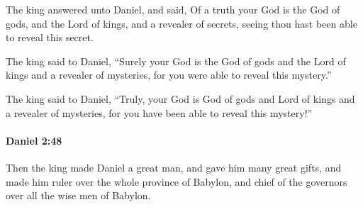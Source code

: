 			\begin{versebox}
					\item[BHS] 
					\item[LXX] 
					\item[ASV] The king answered unto Daniel, and said, Of a truth your God is the God of gods, and the Lord of kings, and a revealer of secrets, seeing thou hast been able to reveal this secret.
					\item[NIV] The king said to Daniel, “Surely your God is the God of gods and the Lord of kings and a revealer of mysteries, for you were able to reveal this mystery.”
					\item[NRSV] The king said to Daniel, “Truly, your God is God of gods and Lord of kings and a revealer of mysteries, for you have been able to reveal this mystery!”
			\end{versebox}

		\paragraph{Daniel 2:48} %
			\label{DANIEL-2-48}

			Then the king made Daniel a great man, and gave him many great gifts, and made him ruler over the whole province of Babylon, and chief of the governors over all the wise men of Babylon.

